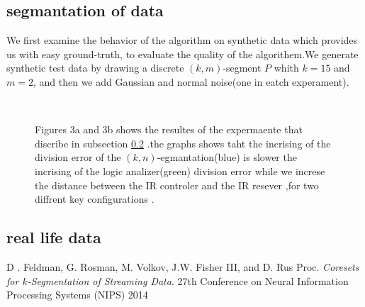 \documentclass[12pt]{llncs}
\begin{document}
\subsection{segmantation of data}
We first examine the behavior of the algorithm on synthetic data which provides us with
easy ground-truth, to evaluate the quality of the algorithem.We generate synthetic test data by drawing a discrete $(k,m)$-segment $P$ whith $k=15$ and $m=2$, and then we add Gaussian and normal noise(one in eatch experament).


\begin{figure}[H]
\centering
{}  \\

\caption{Figures 3a and 3b shows the resultes of the expermaente that discribe in subsection \ref{IR} .the graphs shows taht the incrising of the division error of the $(k,n)$-egmantation(blue) is slower  the incrising of the logic analizer(green) division error while we increse the distance between the IR controler and the IR resever ,for two diffrent key configurations .}
\noindent\makebox[\linewidth]{\rule{\textwidth}{0.4pt}}
\end{figure}
\subsection{real life data}\label{IR}

\medskip

\begin{thebibliography}{9}
D . Feldman, G. Rosman, M. Volkov, J.W. Fisher III, and D. Rus
Proc. 
\textit{Coresets for $k$-Segmentation of Streaming Data}. 
27th Conference on Neural Information Processing Systems (NIPS) 2014
 
\end{thebibliography}
\end{document}
